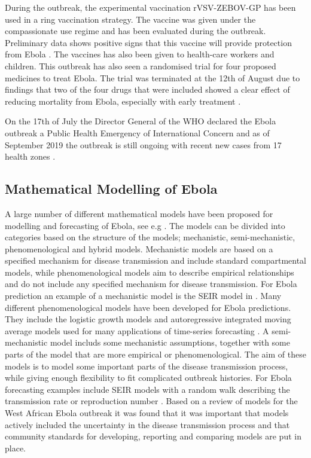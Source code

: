 \documentclass[12pt]{article}
\begin{document}
During the outbreak, the experimental vaccination rVSV-ZEBOV-GP has been used in a ring vaccination strategy. The vaccine was given under the compassionate use regime and has been evaluated during the outbreak. Preliminary data shows positive signs that this vaccine will provide protection from Ebola \cite{organizationPreliminaryResultsEfficacy2019}. The vaccines has also been given to health-care workers and children. This outbreak has also seen a randomised trial for four proposed medicines to treat Ebola. The trial was terminated at the 12th of August due to findings that two of the four drugs that were included showed a clear effect of reducing mortality from Ebola, especially with early treatment \cite{nationalinstituteofallergyandinfectiousdiseasesIndependentMonitoringBoard2019}.

On the 17th of July the Director General of the WHO declared the Ebola outbreak a Public Health Emergency of International Concern \cite{worldhealthorganizationEbolaOutbreakDRC2019} and as of September 2019 the outbreak is still ongoing with recent new cases from 17 health zones \cite{worldhealthorganizationEbolaOutbreakDRC2019b}. 

\subsection{Mathematical Modelling of Ebola}

A large number of different mathematical models have been proposed for modelling and forecasting of Ebola, see e.g \cite{chretienMathematicalModelingWest,viboudRAPIDDEbolaForecasting2018}. The models can be divided into categories based on the structure of the models; mechanistic, semi-mechanistic, phenomenological and hybrid models. Mechanistic models are based on a specified mechanism for disease transmission and include standard compartmental models, while phenomenological models aim to describe empirical relationships and do not include any specified mechanism for disease transmission. For Ebola prediction an example of a mechanistic model is the SEIR model in \cite{gaffeyApplicationCDCEbolaResponse2018}. Many different phenomenological models have been developed for Ebola predictions. They include the logistic growth models \cite{pellUsingPhenomenologicalModels2018} and autoregressive integrated moving average models used for many applications of time-series forecasting \cite{mForecastingTrendCases2017}. A semi-mechanistic model includs some mechanistic assumptions, together with some parts of the model that are more empirical or phenomenological. The aim of these models is to model some important parts of the disease transmission process, while giving enough flexibility to fit complicated outbreak histories. For Ebola forecasting examples include SEIR models with a random walk describing the transmission rate or reproduction number  \cite{funkAssessingPerformanceRealtime2019,asherForecastingEbolaRegression2018}. Based on a review of models for the West African Ebola outbreak it was found that it was important that models actively included the uncertainty in the disease transmission process \cite{chretienMathematicalModelingWest, kingAvoidableErrorsModelling2015} and that community standards for developing, reporting and comparing models are put in place. 
\end{document}
